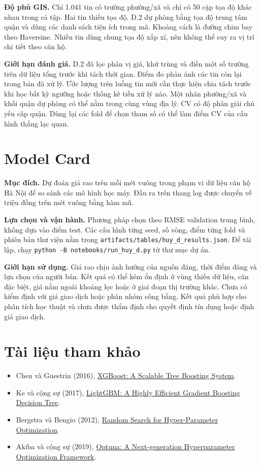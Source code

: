 \documentclass[11pt,a4paper]{article}
\begin{document}
\textbf{Độ phủ GIS.} Chỉ 1.041 tin có trường phường/xã và chỉ có 50 cặp tọa độ khác nhau trong cả tập. Hai tin thiếu tọa độ. D.2 dự phòng bằng tọa độ trung tâm quận và dùng các danh sách tiện ích trong mã. Khoảng cách là đường chim bay theo Haversine. Nhiều tin dùng chung tọa độ xấp xỉ, nên không thể suy ra vị trí chi tiết theo căn hộ.

\textbf{Giới hạn đánh giá.} D.2 đã lọc phân vị giá, khử trùng và điền một số trường trên dữ liệu tổng trước khi tách thời gian. Điểm đo phản ánh các tin còn lại trong bản đã xử lý. Ước lượng trên luồng tin mới cần thực hiện chia tách trước khi học bất kỳ ngưỡng hoặc thống kê tiền xử lý nào. Một nhãn phường/xã và khối quận dự phòng có thể nằm trong cùng vùng địa lý. CV có độ phân giải chủ yếu cấp quận. Dùng lại các fold để chọn tham số có thể làm điểm CV của cấu hình thắng lạc quan.

\section{Model Card}
\textbf{Mục đích.} Dự đoán giá rao trên mỗi mét vuông trong phạm vi dữ liệu căn hộ Hà Nội để so sánh các mô hình học máy. Đầu ra trên thang log được chuyển về triệu đồng trên mét vuông bằng hàm mũ.

\textbf{Lựa chọn và vận hành.} Phương pháp chọn theo RMSE validation trung bình, không dựa vào điểm test. Các cấu hình từng seed, số vòng, điểm từng fold và phiên bản thư viện nằm trong \texttt{artifacts/tables/huy\_d\_results.json}. Để tái lập, chạy \texttt{python -B notebooks/run\_huy\_d.py} từ thư mục dự án.

\textbf{Giới hạn sử dụng.} Giá rao chịu ảnh hưởng của nguồn đăng, thời điểm đăng và lựa chọn của người bán. Kết quả có thể kém ổn định ở vùng thiếu dữ liệu, căn đặc biệt, giá nằm ngoài khoảng lọc hoặc ở giai đoạn thị trường khác. Chưa có kiểm định với giá giao dịch hoặc phân nhóm công bằng. Kết quả phù hợp cho phân tích học thuật và chưa được thẩm định cho quyết định tín dụng hoặc định giá giao dịch.

\section*{Tài liệu tham khảo}
\begin{itemize}
  \item Chen và Guestrin (2016), \href{https://arxiv.org/abs/1603.02754}{XGBoost: A Scalable Tree Boosting System}.
  \item Ke và cộng sự (2017), \href{https://papers.nips.cc/paper_files/paper/2017/hash/6449f44a102fde848669bdd9eb6b76fa-Abstract.html}{LightGBM: A Highly Efficient Gradient Boosting Decision Tree}.
  \item Bergstra và Bengio (2012), \href{https://www.jmlr.org/papers/v13/bergstra12a.html}{Random Search for Hyper-Parameter Optimization}.
  \item Akiba và cộng sự (2019), \href{https://arxiv.org/abs/1907.10902}{Optuna: A Next-generation Hyperparameter Optimization Framework}.
\end{itemize}
\end{document}
